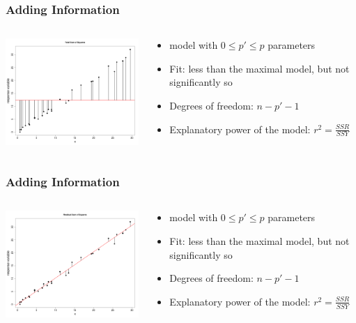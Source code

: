 \documentclass[xcolor={table}]{beamer}
\begin{document}
\begin{frame}\frametitle{Adding Information}
\begin{columns}
\begin{column}{0.6\textwidth}
\includegraphics[width=6.5cm]{minimalmodel.png}
\end{column}
\begin{column}{0.4\textwidth}
\begin{itemize}
\item model with $0 \le p' \le p$ parameters
\item Fit: less than the maximal model, but not significantly so
\item Degrees of freedom: $n-p'-1$
\item Explanatory power of the model: $r^2 = \frac{SSR}{SSY}$    
\end{itemize}
\end{column}
\end{columns}
\end{frame}

\begin{frame}\frametitle{Adding Information}
\begin{columns}
\begin{column}{0.6\textwidth}
\includegraphics[width=6.5cm]{minimalmodel2.png}
\end{column}
\begin{column}{0.4\textwidth}
\begin{itemize}
\item model with $0 \le p' \le p$ parameters
\item Fit: less than the maximal model, but not significantly so
\item Degrees of freedom: $n-p'-1$
\item Explanatory power of the model: $r^2 = \frac{SSR}{SSY}$    
\end{itemize}
\end{column}
\end{columns}
\end{frame}
\end{document}
